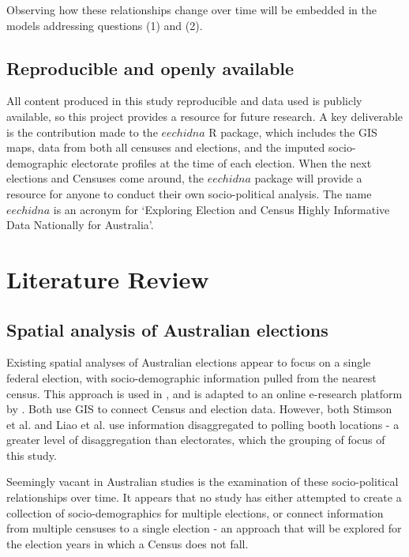 \documentclass{monashthesis}
\theoremstyle{definition}
\theoremstyle{definition}
\theoremstyle{definition}
\theoremstyle{remark}
\begin{document}
Observing how these relationships change over time will be embedded in
the models addressing questions (1) and (2).

\section{Reproducible and openly
available}\label{reproducible-and-openly-available}

All content produced in this study reproducible and data used is
publicly available, so this project provides a resource for future
research. A key deliverable is the contribution made to the \(eechidna\)
R package, which includes the GIS maps, data from both all censuses and
elections, and the imputed socio-demographic electorate profiles at the
time of each election. When the next elections and Censuses come around,
the \(eechidna\) package will provide a resource for anyone to conduct
their own socio-political analysis. The name \(eechidna\) is an acronym
for `Exploring Election and Census Highly Informative Data Nationally
for Australia'.

\chapter{Literature Review}\label{ch:litreview}

\section{Spatial analysis of Australian
elections}\label{spatial-analysis-of-australian-elections}

Existing spatial analyses of Australian elections appear to focus on a
single federal election, with socio-demographic information pulled from
the nearest census. This approach is used in \textcite{Stim06}, and is
adapted to an online e-research platform by \textcite{Liao09}. Both use
GIS to connect Census and election data. However, both Stimson et al.
and Liao et al. use information disaggregated to polling booth locations
- a greater level of disaggregation than electorates, which the grouping
of focus of this study.

Seemingly vacant in Australian studies is the examination of these
socio-political relationships over time. It appears that no study has
either attempted to create a collection of socio-demographics for
multiple elections, or connect information from multiple censuses to a
single election - an approach that will be explored for the election
years in which a Census does not fall.
\end{document}
